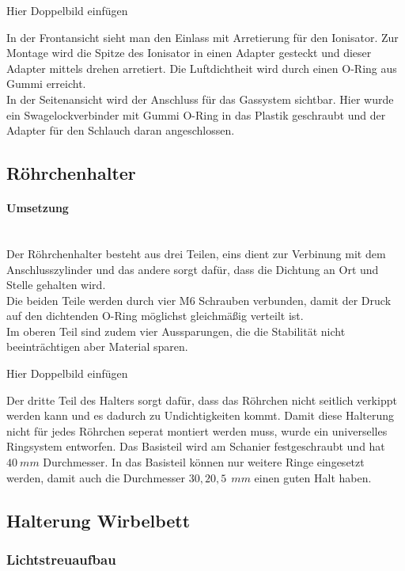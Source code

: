 Hier Doppelbild einfügen


In der Frontansicht sieht man den Einlass mit Arretierung für den Ionisator. Zur Montage wird die Spitze des Ionisator in einen Adapter gesteckt und dieser Adapter mittels drehen arretiert. Die Luftdichtheit wird durch einen O-Ring aus Gummi erreicht. \\
In der Seitenansicht wird der Anschluss für das Gassystem sichtbar. Hier wurde ein Swagelockverbinder mit Gummi O-Ring in das Plastik geschraubt und der Adapter für den Schlauch daran angeschlossen.


\subsection{Röhrchenhalter}

\paragraph{Umsetzung}

\hfill \\

Der Röhrchenhalter besteht aus drei Teilen, eins dient zur Verbinung mit dem Anschlusszylinder und das andere sorgt dafür, dass die Dichtung an Ort und Stelle gehalten wird. \\
Die beiden Teile werden durch vier M6 Schrauben verbunden, damit der Druck auf den dichtenden O-Ring möglichst gleichmäßig verteilt ist. \\
Im oberen Teil sind zudem vier Aussparungen, die die Stabilität nicht beeinträchtigen aber Material sparen. 

Hier Doppelbild einfügen


Der dritte Teil des Halters sorgt dafür, dass das Röhrchen nicht seitlich verkippt werden kann und es dadurch zu Undichtigkeiten kommt. Damit diese Halterung nicht für jedes Röhrchen seperat montiert werden muss, wurde ein universelles Ringsystem entworfen. Das Basisteil wird am Schanier festgeschraubt und hat $\SI{40}{mm}$ Durchmesser. In das Basisteil können nur weitere Ringe eingesetzt werden, damit auch die Durchmesser $30,20,5\SI{}{\ mm}$ einen guten Halt haben.


\subsection{Halterung Wirbelbett}

\subsubsection{Lichtstreuaufbau}


